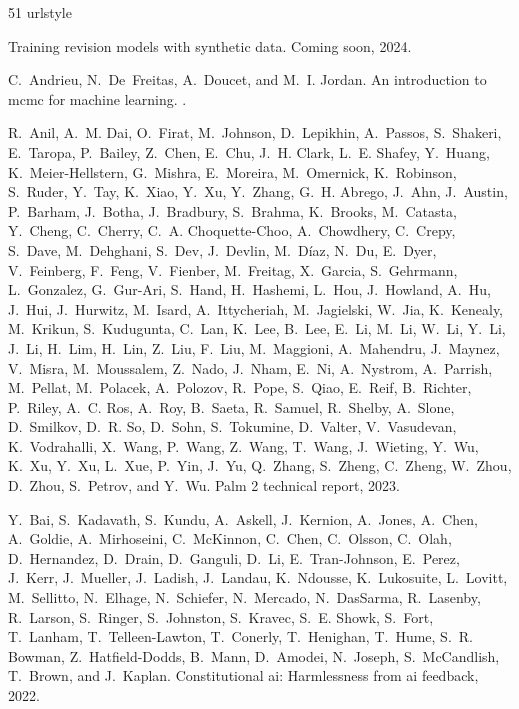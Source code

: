 \begin{thebibliography}{51}
\label{testcompute-references}
\providecommand{\natexlab}[1]{#1}
\providecommand{\url}[1]{\texttt{#1}}
\expandafter\ifx\csname urlstyle\endcsname\relax
  \providecommand{\doi}[1]{doi: #1}\else
  \providecommand{\doi}{doi: \begingroup \urlstyle{rm}\Url}\fi

Training revision models with synthetic data.
\newblock Coming soon, 2024.

C.~Andrieu, N.~De~Freitas, A.~Doucet, and M.~I. Jordan.
\newblock An introduction to mcmc for machine learning.
.

R.~Anil, A.~M. Dai, O.~Firat, M.~Johnson, D.~Lepikhin, A.~Passos, S.~Shakeri, E.~Taropa, P.~Bailey, Z.~Chen, E.~Chu, J.~H. Clark, L.~E. Shafey, Y.~Huang, K.~Meier-Hellstern, G.~Mishra, E.~Moreira, M.~Omernick, K.~Robinson, S.~Ruder, Y.~Tay, K.~Xiao, Y.~Xu, Y.~Zhang, G.~H. Abrego, J.~Ahn, J.~Austin, P.~Barham, J.~Botha, J.~Bradbury, S.~Brahma, K.~Brooks, M.~Catasta, Y.~Cheng, C.~Cherry, C.~A. Choquette-Choo, A.~Chowdhery, C.~Crepy, S.~Dave, M.~Dehghani, S.~Dev, J.~Devlin, M.~Díaz, N.~Du, E.~Dyer, V.~Feinberg, F.~Feng, V.~Fienber, M.~Freitag, X.~Garcia, S.~Gehrmann, L.~Gonzalez, G.~Gur-Ari, S.~Hand, H.~Hashemi, L.~Hou, J.~Howland, A.~Hu, J.~Hui, J.~Hurwitz, M.~Isard, A.~Ittycheriah, M.~Jagielski, W.~Jia, K.~Kenealy, M.~Krikun, S.~Kudugunta, C.~Lan, K.~Lee, B.~Lee, E.~Li, M.~Li, W.~Li, Y.~Li, J.~Li, H.~Lim, H.~Lin, Z.~Liu, F.~Liu, M.~Maggioni, A.~Mahendru, J.~Maynez, V.~Misra, M.~Moussalem, Z.~Nado, J.~Nham, E.~Ni, A.~Nystrom, A.~Parrish, M.~Pellat, M.~Polacek, A.~Polozov, R.~Pope, S.~Qiao, E.~Reif, B.~Richter,
  P.~Riley, A.~C. Ros, A.~Roy, B.~Saeta, R.~Samuel, R.~Shelby, A.~Slone, D.~Smilkov, D.~R. So, D.~Sohn, S.~Tokumine, D.~Valter, V.~Vasudevan, K.~Vodrahalli, X.~Wang, P.~Wang, Z.~Wang, T.~Wang, J.~Wieting, Y.~Wu, K.~Xu, Y.~Xu, L.~Xue, P.~Yin, J.~Yu, Q.~Zhang, S.~Zheng, C.~Zheng, W.~Zhou, D.~Zhou, S.~Petrov, and Y.~Wu.
\newblock Palm 2 technical report, 2023.

Y.~Bai, S.~Kadavath, S.~Kundu, A.~Askell, J.~Kernion, A.~Jones, A.~Chen, A.~Goldie, A.~Mirhoseini, C.~McKinnon, C.~Chen, C.~Olsson, C.~Olah, D.~Hernandez, D.~Drain, D.~Ganguli, D.~Li, E.~Tran-Johnson, E.~Perez, J.~Kerr, J.~Mueller, J.~Ladish, J.~Landau, K.~Ndousse, K.~Lukosuite, L.~Lovitt, M.~Sellitto, N.~Elhage, N.~Schiefer, N.~Mercado, N.~DasSarma, R.~Lasenby, R.~Larson, S.~Ringer, S.~Johnston, S.~Kravec, S.~E. Showk, S.~Fort, T.~Lanham, T.~Telleen-Lawton, T.~Conerly, T.~Henighan, T.~Hume, S.~R. Bowman, Z.~Hatfield-Dodds, B.~Mann, D.~Amodei, N.~Joseph, S.~McCandlish, T.~Brown, and J.~Kaplan.
\newblock Constitutional ai: Harmlessness from ai feedback, 2022.


\end{thebibliography}
